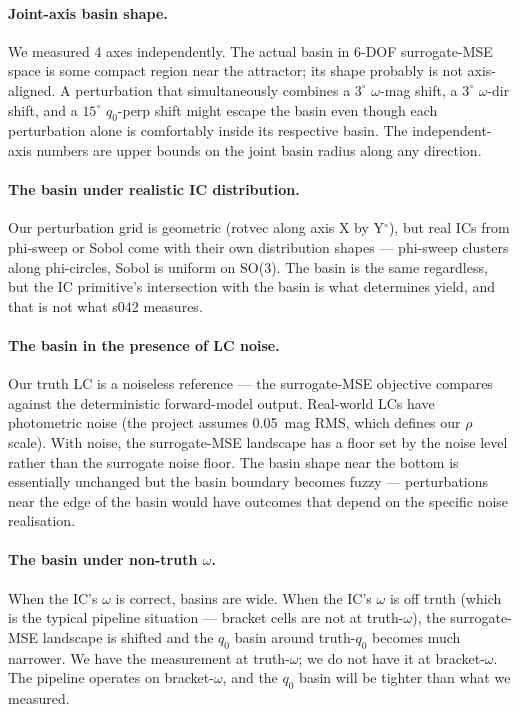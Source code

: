\documentclass[11pt,a4paper]{article}
\begin{document}
\paragraph{Joint-axis basin shape.} We measured 4 axes independently. The actual basin in 6-DOF surrogate-MSE space is some compact region near the attractor; its shape probably is not axis-aligned. A perturbation that simultaneously combines a $3^\circ$ $\omega$-mag shift, a $3^\circ$ $\omega$-dir shift, and a $15^\circ$ $q_0$-perp shift might escape the basin even though each perturbation alone is comfortably inside its respective basin. The independent-axis numbers are upper bounds on the joint basin radius along any direction.

\paragraph{The basin under realistic IC distribution.} Our perturbation grid is geometric (rotvec along axis X by Y$^\circ$), but real ICs from phi-sweep or Sobol come with their own distribution shapes --- phi-sweep clusters along phi-circles, Sobol is uniform on SO(3). The basin is the same regardless, but the IC primitive's intersection with the basin is what determines yield, and that is not what s042 measures.

\paragraph{The basin in the presence of LC noise.} Our truth LC is a noiseless reference --- the surrogate-MSE objective compares against the deterministic forward-model output. Real-world LCs have photometric noise (the project assumes 0.05~mag RMS, which defines our $\rho$ scale). With noise, the surrogate-MSE landscape has a floor set by the noise level rather than the surrogate noise floor. The basin shape near the bottom is essentially unchanged but the basin boundary becomes fuzzy --- perturbations near the edge of the basin would have outcomes that depend on the specific noise realisation.

\paragraph{The basin under non-truth $\omega$.} When the IC's $\omega$ is correct, basins are wide. When the IC's $\omega$ is off truth (which is the typical pipeline situation --- bracket cells are not at truth-$\omega$), the surrogate-MSE landscape is shifted and the $q_0$ basin around truth-$q_0$ becomes much narrower. We have the measurement at truth-$\omega$; we do not have it at bracket-$\omega$. The pipeline operates on bracket-$\omega$, and the $q_0$ basin will be tighter than what we measured.
\end{document}

